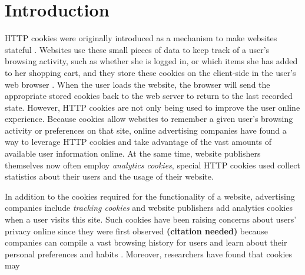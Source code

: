 \section{Introduction}
\label{sec:intro}

HTTP cookies were originally introduced as a mechanism to make websites stateful \cite{httpcookies}.
Websites use these small pieces of data to keep track of a user's browsing activity, such as whether she is logged in, or which items she has added to her shopping cart, and they store these cookies on the client-side in the user's web browser \cite{httpcookies}.
When the user loads the website, the browser will send the appropriate stored cookies back to the web server to return to the last recorded state.
However, HTTP cookies are not only being used to improve the user online experience.
Because cookies allow websites to remember a given user's browsing activity or preferences on that site, online advertising companies have found a way to leverage HTTP cookies and take advantage of the vast amounts of available user information online.
At the same time, website publishers themselves now often employ \emph{analytics cookies}, special HTTP cookies used collect statistics about their users and the usage of their website.

In addition to the cookies required for the functionality of a website, advertising companies include \emph{tracking cookies} and website publishers add analytics cookies when a user visits this site.
Such cookies have been raising concerns about users' privacy online since they were first observed \textbf{(citation needed)} because companies can compile a vast browsing history for users and learn about their personal preferences and habits \cite{dntbill}.
Moreover, researchers have found that cookies may 